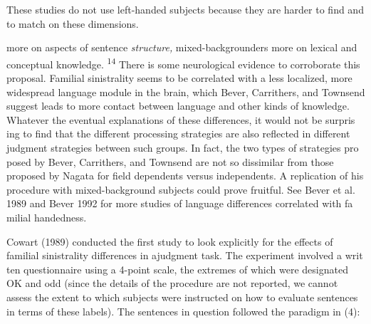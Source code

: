 \setcounter{listWWNumxlileveli}{4}
\begin{listWWNumxlileveli}
\item 
\setcounter{listWWNumxlilevelii}{10}
\begin{listWWNumxlilevelii}
\item 
\begin{styleStandard}
These studies do not use left-handed subjects because they are harder to find and to match on these dimensions.
\end{styleStandard}


\end{listWWNumxlilevelii}
\end{listWWNumxlileveli}
\clearpage\setcounter{page}{1}\begin{styleStandard}
more on aspects of sentence \textit{structure,}\textit{ }mixed-backgrounders more on lexical and conceptual knowledge. \textsuperscript{14}\textsuperscript{ }There is some neurological evidence to corroborate this proposal. Familial sinistrality seems to be correlated with a less localized, more widespread language module in the brain, which Bever, Carrithers, and Townsend suggest leads to more contact between language and other kinds of knowledge. Whatever the eventual explanations of these differences, it would not be surpris\- ing to find that the different processing strategies are also reflected in different judgment strategies between such groups. In fact, the two types of strategies pro\- posed by Bever, Carrithers, and Townsend are not so dissimilar from those proposed by Nagata for field dependents versus independents. A replication of his procedure with mixed-background subjects could prove fruitful. See Bever et al. 1989 and Bever 1992 for more studies of language differences correlated with fa\- milial handedness.
\end{styleStandard}


\begin{styleStandard}
Cowart (1989) conducted the first study to look explicitly for the effects of familial sinistrality differences in ajudgment task. The experiment involved a writ\- ten questionnaire using a 4-point scale, the extremes of which were designated {\textquotedbl}OK{\textquotedbl} and {\textquotedbl}odd{\textquotedbl} (since the details of the procedure are not reported, we cannot assess the extent to which subjects were instructed on how to evaluate sentences in terms of these labels). The sentences in question followed the paradigm in (4):
\end{styleStandard}


